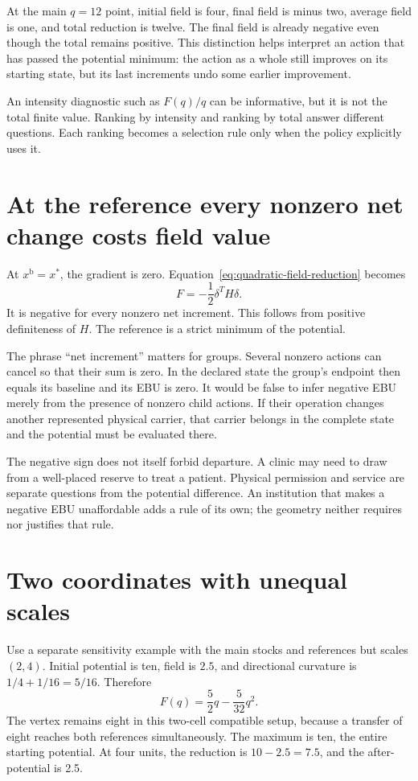 At the main \(q=12\) point, initial field is four, final field is minus two, average field is one, and total reduction is twelve. The final field is already negative even though the total remains positive. This distinction helps interpret an action that has passed the potential minimum: the action as a whole still improves on its starting state, but its last increments undo some earlier improvement.

An intensity diagnostic such as \(F(q)/q\) can be informative, but it is not the total finite value. Ranking by intensity and ranking by total answer different questions. Each ranking becomes a selection rule only when the policy explicitly uses it.

\section{At the reference every nonzero net change costs field value}
At \(x^{\mathrm{b}}=x^*\), the gradient is zero. Equation~\ref{eq:quadratic-field-reduction} becomes
\begin{equation}
 F=-\frac12\delta^TH\delta.
\end{equation}
It is negative for every nonzero net increment. This follows from positive definiteness of \(H\). The reference is a strict minimum of the potential.

The phrase ``net increment'' matters for groups. Several nonzero actions can cancel so that their sum is zero. In the declared state the group's endpoint then equals its baseline and its EBU is zero. It would be false to infer negative EBU merely from the presence of nonzero child actions. If their operation changes another represented physical carrier, that carrier belongs in the complete state and the potential must be evaluated there.

The negative sign does not itself forbid departure. A clinic may need to draw from a well-placed reserve to treat a patient. Physical permission and service are separate questions from the potential difference. An institution that makes a negative EBU unaffordable adds a rule of its own; the geometry neither requires nor justifies that rule.

\section{Two coordinates with unequal scales}
Use a separate sensitivity example with the main stocks and references but scales \((2,4)\). Initial potential is ten, field is \(2.5\), and directional curvature is \(1/4+1/16=5/16\). Therefore
\begin{equation}
 F(q)=\frac52q-\frac{5}{32}q^2.
\end{equation}
The vertex remains eight in this two-cell compatible setup, because a transfer of eight reaches both references simultaneously. The maximum is ten, the entire starting potential. At four units, the reduction is \(10-2.5=7.5\), and the after-potential is 2.5.

